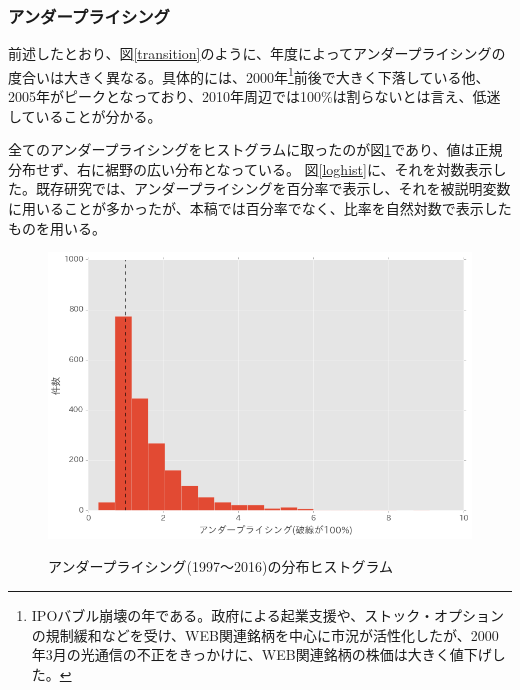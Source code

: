 \documentclass{jsarticle}
\begin{document}
\subsubsection{アンダープライシング}
前述したとおり、図\ref{transition}のように、年度によってアンダープライシングの度合いは大きく異なる。具体的には、2000年\footnote[10]{IPOバブル崩壊の年である。政府による起業支援や、ストック・オプションの規制緩和などを受け、WEB関連銘柄を中心に市況が活性化したが、2000年3月の光通信の不正をきっかけに、WEB関連銘柄の株価は大きく値下げした。}前後で大きく下落している他、2005年がピークとなっており、2010年周辺では100\%は割らないとは言え、低迷していることが分かる。\par
全てのアンダープライシングをヒストグラムに取ったのが図\ref{hist}であり、値は正規分布せず、右に裾野の広い分布となっている。
図\ref{loghist}に、それを対数表示した。既存研究では、アンダープライシングを百分率で表示し、それを被説明変数に用いることが多かったが、本稿では百分率でなく、比率を自然対数で表示したものを用いる。\par

\newpage

\begin{figure}[!h]
  \begin{center}
  \caption{アンダープライシング(1997〜2016)の分布ヒストグラム}
    \includegraphics[clip,width=14cm]{./hist.png}
    \label{hist}
  \end{center}
\end{figure}
\end{document}

